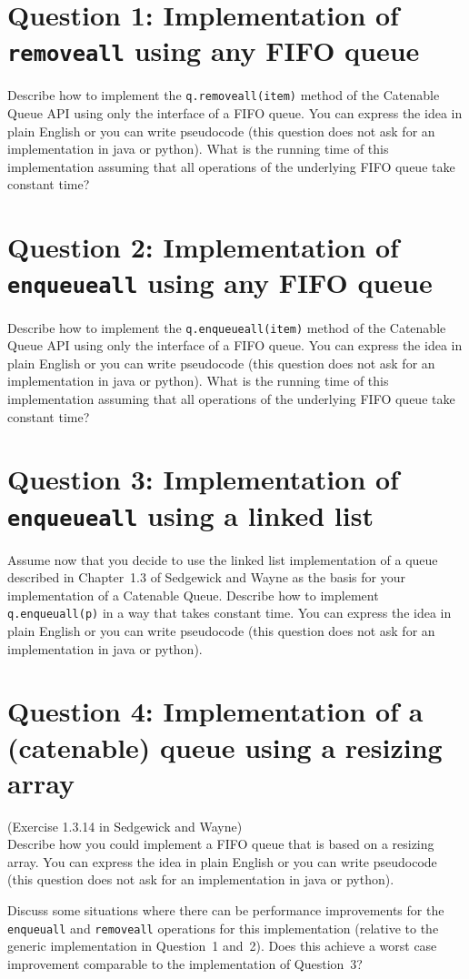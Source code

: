 \documentclass{tufte-handout}
\begin{document}
\section{\textbf{Question 1}: Implementation of \texttt{removeall} using any FIFO queue}

Describe how to implement the \texttt{q.removeall(item)} method of the Catenable Queue API using only the interface of a FIFO queue.
You can express the idea in plain English or you can write pseudocode (this question does not ask for an implementation in java or python).
What is the running time of this implementation assuming that all operations of the underlying FIFO queue take constant time?

\section{\textbf{Question 2}: Implementation of \texttt{enqueueall} using any FIFO queue}

Describe how to implement the \texttt{q.enqueueall(item)} method of the Catenable Queue API using only the interface of a FIFO queue.
You can express the idea in plain English or you can write pseudocode (this question does not ask for an implementation in java or python).
What is the running time of this implementation assuming that all operations of the underlying FIFO queue take constant time?

\section{\textbf{Question 3}: Implementation of \texttt{enqueueall} using a linked list}

Assume now that you decide to use the linked list implementation of a queue described in Chapter~1.3 of Sedgewick and Wayne as the basis for your implementation of a Catenable Queue.
Describe how to implement \texttt{q.enqueuall(p)} in a way that takes constant time.
You can express the idea in plain English or you can write pseudocode (this question does not ask for an implementation in java or python).

\section{\textbf{Question 4}: Implementation of a (catenable) queue using a resizing array}


(Exercise 1.3.14 in Sedgewick and Wayne)\\
Describe how you could implement a FIFO queue that is based on a resizing array.
You can express the idea in plain English or you can write pseudocode (this question does not ask for an implementation in java or python).

Discuss some situations where there can be performance improvements for the \texttt{enqueuall} and \texttt{removeall} operations for this implementation (relative to the generic implementation in Question~1 and~2).
Does this achieve a worst case improvement comparable to the implementation of Question~3?
\end{document}
